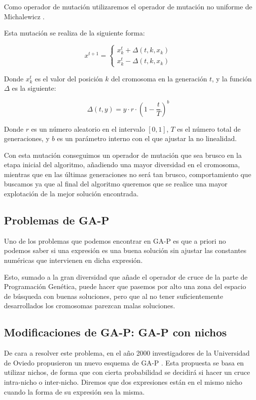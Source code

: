 Como operador de mutación utilizaremos el operador de mutación no uniforme de Michalewicz \cite{mutacionMichalewicz}.

Esta mutación se realiza de la siguiente forma:

\[ x^{t + 1} =
	\begin{cases}
		x_k^t + \Delta(t, k, x_k)\\
		x_k^t - \Delta(t, k, x_k)
	\end{cases}
\]

Donde $x_k^t$ es el valor del posición $k$ del cromosoma en la generación $t$, y la función $\Delta$ es la siguiente:

$$ \Delta(t, y) = y \cdot r \cdot (1 - \frac{t}{T})^b $$

Donde $r$ es un número aleatorio en el intervalo $[0, 1]$, $T$ es el número total de generaciones, y $b$ es un parámetro interno con el que ajustar la no linealidad.

Con esta mutación conseguimos un operador de mutación que sea brusco en la etapa inicial del algoritmo, añadiendo una mayor diversidad en el cromosoma, mientras que en las últimas generaciones no será tan brusco, comportamiento que buscamos ya que al final del algoritmo queremos que se realice una mayor explotación de la mejor solución encontrada.

\subsection{Problemas de GA-P}

Uno de los problemas que podemos encontrar en GA-P es que a priori no podemos saber si una expresión es una buena solución sin ajustar las constantes numéricas que intervienen en dicha expresión.

Esto, sumado a la gran diversidad que añade el operador de cruce de la parte de Programación Genética, puede hacer que pasemos por alto una zona del espacio de búsqueda con buenas soluciones, pero que al no tener suficientemente desarrollados los cromosomas parezcan malas soluciones.


\newpage

\subsection{Modificaciones de GA-P: GA-P con nichos}

De cara a resolver este problema, en el año 2000 investigadores de la Universidad de Oviedo propusieron un nuevo esquema de GA-P \cite{GAPnichos}. Esta propuesta se basa en utilizar nichos, de forma que con cierta probabilidad se decidirá si hacer un cruce intra-nicho o inter-nicho. Diremos que dos expresiones están en el mismo nicho cuando la forma de su expresión sea la misma.

